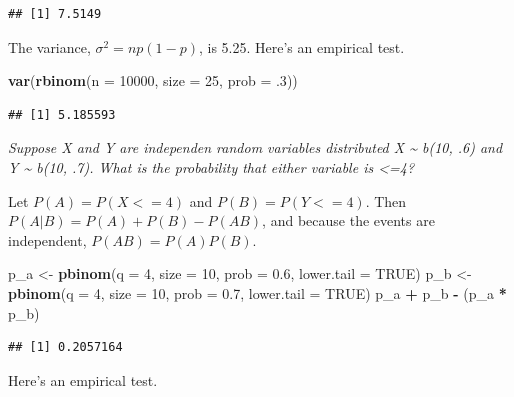 \documentclass[
]{book}
\newenvironment{Shaded}{\begin{snugshade}}{\end{snugshade}}
\newcommand{\DataTypeTok}[1]{\textcolor[rgb]{0.13,0.29,0.53}{#1}}
\newcommand{\DecValTok}[1]{\textcolor[rgb]{0.00,0.00,0.81}{#1}}
\newcommand{\FloatTok}[1]{\textcolor[rgb]{0.00,0.00,0.81}{#1}}
\newcommand{\KeywordTok}[1]{\textcolor[rgb]{0.13,0.29,0.53}{\textbf{#1}}}
\newcommand{\NormalTok}[1]{#1}
\newcommand{\OperatorTok}[1]{\textcolor[rgb]{0.81,0.36,0.00}{\textbf{#1}}}
\newcommand{\OtherTok}[1]{\textcolor[rgb]{0.56,0.35,0.01}{#1}}
\newcommand{\StringTok}[1]{\textcolor[rgb]{0.31,0.60,0.02}{#1}}
\begin{document}
\begin{verbatim}
## [1] 7.5149
\end{verbatim}

The variance, \(\sigma^2 = np (1 - p)\), is 5.25. Here's an empirical test.

\begin{Shaded}
\begin{Highlighting}[]
\KeywordTok{var}\NormalTok{(}\KeywordTok{rbinom}\NormalTok{(}\DataTypeTok{n =} \DecValTok{10000}\NormalTok{, }\DataTypeTok{size =} \DecValTok{25}\NormalTok{, }\DataTypeTok{prob =} \FloatTok{.3}\NormalTok{))}
\end{Highlighting}
\end{Shaded}

\begin{verbatim}
## [1] 5.185593
\end{verbatim}

\emph{Suppose X and Y are independen random variables distributed X \textasciitilde{} b(10, .6) and Y \textasciitilde{} b(10, .7). What is the probability that either variable is \textless=4?}

Let \(P(A) = P(X<=4)\) and \(P(B) = P(Y<=4)\). Then \(P(A|B) = P(A) + P(B) - P(AB)\), and because the events are independent, \(P(AB) = P(A)P(B)\).

\begin{Shaded}
\begin{Highlighting}[]
\NormalTok{p_a <-}\StringTok{ }\KeywordTok{pbinom}\NormalTok{(}\DataTypeTok{q =} \DecValTok{4}\NormalTok{, }\DataTypeTok{size =} \DecValTok{10}\NormalTok{, }\DataTypeTok{prob =} \FloatTok{0.6}\NormalTok{, }\DataTypeTok{lower.tail =} \OtherTok{TRUE}\NormalTok{)}
\NormalTok{p_b <-}\StringTok{ }\KeywordTok{pbinom}\NormalTok{(}\DataTypeTok{q =} \DecValTok{4}\NormalTok{, }\DataTypeTok{size =} \DecValTok{10}\NormalTok{, }\DataTypeTok{prob =} \FloatTok{0.7}\NormalTok{, }\DataTypeTok{lower.tail =} \OtherTok{TRUE}\NormalTok{)}
\NormalTok{p_a }\OperatorTok{+}\StringTok{ }\NormalTok{p_b }\OperatorTok{-}\StringTok{ }\NormalTok{(p_a }\OperatorTok{*}\StringTok{ }\NormalTok{p_b)}
\end{Highlighting}
\end{Shaded}

\begin{verbatim}
## [1] 0.2057164
\end{verbatim}

Here's an empirical test.
\end{document}
